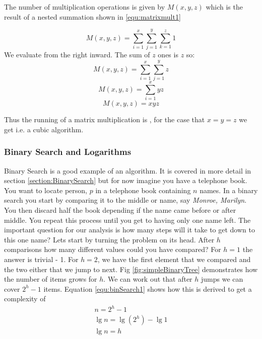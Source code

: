 			The number of multiplication operations is given by $M(x, y, z)$ which is the result of a nested summation shown in \ref{equ:matrixmult1}
			
			\begin{equation}\label{equ:matrixmult1}
				M(x,y,z) = \sum_{i=1}^{x} \sum_{j=1}^{y} \sum_{k=1}^{z} 1 	
 			\end{equation}
 			We evaluate from the right inward. The sum of $z$ ones is $z$ so:
 			\begin{equation}\label{equ:matrixmult2}
	 			M(x,y,z) = \sum_{i=1}^{x} \sum_{j=1}^{y} z
	 		\end{equation}
	 		\begin{equation}\label{equ:matrixmult3}
	 			M(x,y,z) = \sum_{i=1}^{x}yz
	 		\end{equation}
		 	\begin{equation}\label{equ:matrixmult4}
	 			M(x,y,z) = xyz
 			\end{equation}
	 		
	 		Thus the running of a matrix multiplication  is , for the case that $x = y = z$ we get  i.e. a cubic algorithm.
		\subsubsection{Binary Search and Logarithms}
			Binary Search  is a good example of an  algorithm. It is covered in more detail in section \ref{section:BinarySearch} but for now imagine you have a telephone book. You want to locate person, $p$ in a telephone book containing $n$ names. In a binary search you start by comparing it to the middle or  name, say \textit{Monroe, Marilyn}. You then discard half the book depending if the name came before or after middle. You repeat this process until you get to having only one name left. The important question for our analysis is how many steps will it take to get down to this one name? 
			Lets start by turning the problem on its head. After $h$ comparisons how many different values could you have compared? For $h = 1$ the answer is trivial - 1. For $h = 2$, we have the first element that we compared and the two either that we jump to next. Fig \ref{fig:simpleBinaryTree} demonstrates how the number of items grows for $h$. We can work out that after $h$ jumps we can cover $2^h - 1$ items. Equation \ref{equ:binSearch1} shows how this is derived to get a complexity of 
			\begin{gather}
				n = 2^h - 1 \label{equ:binSearch1} \\
				\lg n = \lg(2^h) - \lg 1 \label{equ:binSearch2} \\
				\lg n = h \label{equ:binSearch3}
			\end{gather}
			
